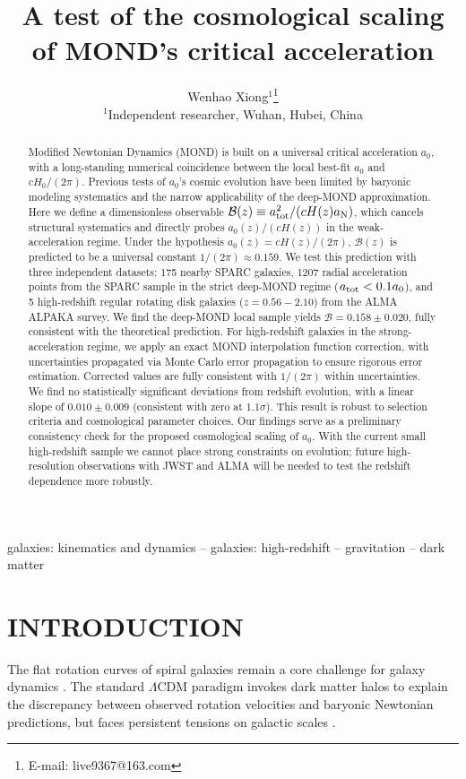 \documentclass[fleqn,usenatbib]{mnras}
\title[MOND acceleration cosmological scaling]
{A test of the cosmological scaling of MOND's critical acceleration}
\author[Wenhao Xiong]{
Wenhao Xiong$^{1}$\thanks{E-mail: live9367@163.com}
\\
$^{1}$Independent researcher, Wuhan, Hubei, China
}
\date{}
\newcommand{\Bz}{\mathcal{B}(z)}
\newcommand{\atot}{a_{\rm tot}}
\newcommand{\aN}{a_{\rm N}}
\newcommand{\aMOND}{a_0}
\newcommand{\Hz}{H(z)}
\newcommand{\Hzero}{H_0}
\newcommand{\LCDM}{\Lambda\mathrm{CDM}}
\begin{document}
\maketitle

\begin{abstract}
Modified Newtonian Dynamics (MOND) is built on a universal critical acceleration $\aMOND$, with a long-standing numerical coincidence between the local best-fit $\aMOND$ and $c\Hzero/(2\pi)$. Previous tests of $\aMOND$'s cosmic evolution have been limited by baryonic modeling systematics and the narrow applicability of the deep-MOND approximation. Here we define a dimensionless observable $\Bz \equiv \atot^2/(c \Hz \aN)$, which cancels structural systematics and directly probes $\aMOND(z)/(c\Hz)$ in the weak-acceleration regime. Under the hypothesis $\aMOND(z) = c\Hz/(2\pi)$, $\Bz$ is predicted to be a universal constant $1/(2\pi) \approx 0.159$. We test this prediction with three independent datasets: 175 nearby SPARC galaxies, 1207 radial acceleration points from the SPARC sample in the strict deep-MOND regime ($\atot < 0.1\aMOND$), and 5 high-redshift regular rotating disk galaxies ($z=0.56-2.10$) from the ALMA ALPAKA survey. We find the deep-MOND local sample yields $\mathcal{B} = 0.158 \pm 0.020$, fully consistent with the theoretical prediction. For high-redshift galaxies in the strong-acceleration regime, we apply an exact MOND interpolation function correction, with uncertainties propagated via Monte Carlo error propagation to ensure rigorous error estimation. Corrected values are fully consistent with $1/(2\pi)$ within uncertainties. We find no statistically significant deviations from redshift evolution, with a linear slope of $0.010 \pm 0.009$ (consistent with zero at $1.1\sigma$). This result is robust to selection criteria and cosmological parameter choices. Our findings serve as a preliminary consistency check for the proposed cosmological scaling of $\aMOND$. With the current small high-redshift sample we cannot place strong constraints on evolution; future high-resolution observations with JWST and ALMA will be needed to test the redshift dependence more robustly.
\end{abstract}

\begin{keywords}
galaxies: kinematics and dynamics -- galaxies: high-redshift -- gravitation -- dark matter
\end{keywords}

\section{INTRODUCTION}
The flat rotation curves of spiral galaxies remain a core challenge for galaxy dynamics \citep{Zwicky1937, Rubin1980}. The standard $\LCDM$ paradigm invokes dark matter halos to explain the discrepancy between observed rotation velocities and baryonic Newtonian predictions, but faces persistent tensions on galactic scales \citep{deBlok2010, McGaugh2016}.
\end{document}
